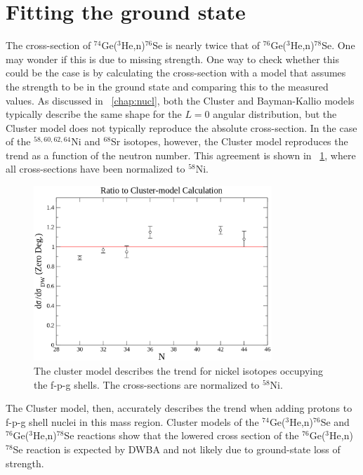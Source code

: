 \section{Fitting the \zp ground state}

The cross-section of $^{74}$Ge($^3$He,n)$^{76}$Se is nearly twice that of $^{76}$Ge($^3$He,n)$^{78}$Se.  One may wonder if this is due to missing \zp strength.  One way to check whether this could be the case is by calculating the cross-section with a model that assumes the \zp strength to be in the ground state and comparing this to the measured values.  As discussed in {\chap}~\ref{chap:nucl}, both the Cluster and Bayman-Kallio models typically describe the same shape for the $L=0$ angular distribution, but the Cluster model does not typically reproduce the absolute cross-section.  In the case of the $^{58,60,62,64}$Ni and $^{68}$Sr isotopes, however, the Cluster model reproduces the trend as a function of the neutron number.  This agreement is shown in {\fig}~\ref{fig:nickelTrend}, where all cross-sections have been normalized to $^{58}$Ni.  
\begin{figure}[!htbp]
\centering
\includegraphics[width=0.8\textwidth]{figures/nickel_trend.eps}
\caption{The cluster model describes the trend for nickel isotopes occupying the f-p-g shells.  The cross-sections are normalized to $^{58}$Ni.}
\label{fig:nickelTrend}
\end{figure}
The Cluster model, then, accurately describes the trend when adding protons to f-p-g shell nuclei in this mass region.  Cluster models of the $^{74}$Ge($^3$He,n)$^{76}$Se and $^{76}$Ge($^3$He,n)$^{78}$Se reactions show that the lowered cross section of the $^{76}$Ge($^3$He,n)$^{78}$Se reaction is expected by DWBA and not likely due to ground-state loss of \zp strength.   

